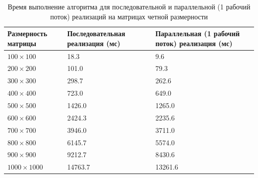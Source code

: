 \documentclass[a4paper,14pt]{article}
\begin{document}
    	\begin{table} [h!]
    	\begin{center}
    	\caption{Время выполнение алгоритма для последовательной и параллельной (1 рабочий поток) реализаций на матрицах четной размерности}
    	\begin{tabular}{|p{5cm}|p{5cm}|p{5cm}|}
    	\hline 
    	Размерность матрицы & Последовательная реализация (мс) & Параллельная (1 рабочий поток) реализация (мс) \\ 
    	\hline 
    	$100 \times 100$ & 18.3 & 9.6 \\ 
    	\hline 
    	$200 \times 200$ & 101.0 & 79.3 \\ 
    	\hline 
    	$300 \times 300$ & 298.7 & 262.6 \\ 
    	\hline 
    	$400 \times 400$ & 723.0 & 649.0 \\ 
    	\hline 
    	$500 \times 500$ & 1426.0 & 1265.0 \\ 
    	\hline 
    	$600 \times 600$ & 2424.3 & 2235.6  \\ 
    	\hline 
    	$700 \times 700$ & 3946.0 & 3711.0 \\ 
    	\hline 
    	$800 \times 800$ & 6145.7 & 5574.0 \\ 
    	\hline 
    	$900 \times 900$ & 9212.7 & 8430.6 \\ 
    	\hline 
    	$1000 \times 1000$ & 14763.7 & 13261.6 \\ 
    	\hline 
    	\end{tabular} 
    	\label{table:table01}
    	\end{center}
    	\end{table}
    	
\end{document}
